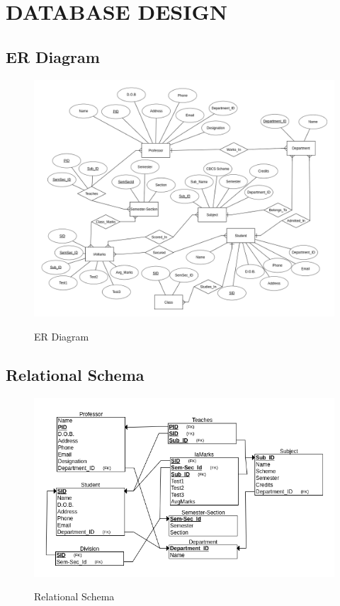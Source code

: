\chapter{DATABASE DESIGN}

\section{ER Diagram}
\begin{figure}[H]
\centering
\caption{ER Diagram}
\includegraphics[scale=0.47]{./erd.png}
\label{fig:ER diagram}
\end{figure}

\thispagestyle{fancy}

\section{Relational Schema}
\begin{figure}[H]
\centering
\caption{Relational Schema}
\includegraphics[scale=.7]{./schema.png}
\\[0.2in]
\label{fig:Relational Schema}
\end{figure}

\thispagestyle{fancy}
